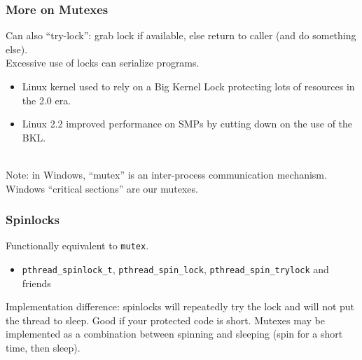 \documentclass[aspectratio=43]{beamer}
\newenvironment{changemargin}[1]{%
  \begin{list}{}{%
    \setlength{\topsep}{0pt}%
    \setlength{\leftmargin}{#1}%
    \setlength{\rightmargin}{1em}
    \setlength{\listparindent}{\parindent}%
    \setlength{\itemindent}{\parindent}%
    \setlength{\parsep}{\parskip}%
  }%
  \item[]}{\end{list}}
\begin{document}
\begin{frame}
  \frametitle{More on Mutexes}

  \begin{changemargin}{2.5cm}
     Can also ``try-lock'': grab lock if available, else return
     to caller (and do something else).\\[1em]

     Excessive use of locks can serialize programs. 
\begin{itemize}
\item Linux kernel used to
rely on a Big Kernel Lock protecting lots of resources in the 2.0 era.
\item Linux 2.2 improved performance on SMPs by cutting down on the use
of the BKL.
\end{itemize}~\\[1em]

Note: in Windows, ``mutex'' is an inter-process
communication mechanism. Windows ``critical sections'' are our mutexes.

  \end{changemargin}
\end{frame}

\begin{frame}
  \frametitle{Spinlocks}

  \begin{changemargin}{2.5cm}
    Functionally equivalent to {\tt mutex}.

  \begin{itemize}
    \item  {\tt pthread\_spinlock\_t},
      {\tt pthread\_spin\_lock}, {\tt pthread\_spin\_trylock} and friends
  \end{itemize}
 
    \vfill
    Implementation difference: spinlocks will repeatedly try the lock and will not put
      the thread to sleep.
    \vfill
    Good if your protected code is short.
    \vfill
    Mutexes may be implemented as a combination between spinning and sleeping
      (spin for a short time, then sleep).
  \end{changemargin}
\end{frame}
\end{document}
